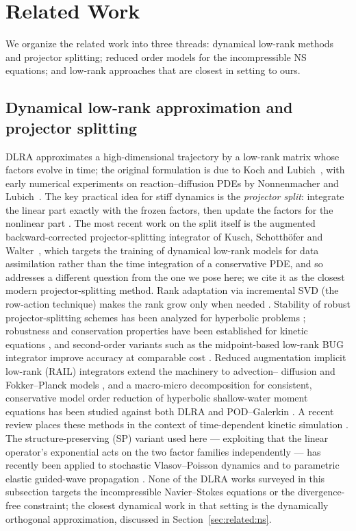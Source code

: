 
\section{Related Work}
\label{sec:related}

We organize the related work into three threads: dynamical low-rank methods
and projector splitting; reduced order models for the incompressible NS
equations; and low-rank approaches that are closest in setting to ours.

\subsection{Dynamical low-rank approximation and projector splitting}
\label{sec:related:dlra}

DLRA approximates a high-dimensional trajectory by a low-rank matrix whose
factors evolve in time; the original formulation is due to Koch and
Lubich~\cite{koch2007}, with early numerical experiments on reaction--diffusion
PDEs by Nonnenmacher and Lubich~\cite{nonnenmacher2008}. The key practical idea
for stiff dynamics is
the \emph{projector split}: integrate the linear part exactly with the frozen
factors, then update the factors for the nonlinear part
\cite{lubich2014}. The most recent work on the split itself is the augmented
backward-corrected projector-splitting integrator of Kusch, Schotthöfer and
Walter~\cite{kusch2026augmented}, which targets the training of dynamical
low-rank models for data assimilation rather than the time integration of a
conservative PDE, and so addresses a different question from the one we pose
here; we cite it as the closest modern projector-splitting method. Rank
adaptation via incremental SVD (the row-action technique) makes the rank grow
only when needed \cite{haasdonk2012}.
Stability of robust projector-splitting schemes has been analyzed for
hyperbolic problems \cite{kusch2023stability}; robustness and conservation
properties have been established for kinetic equations \cite{einkemmer2023},
and second-order variants such as the midpoint-based low-rank BUG integrator
improve accuracy at comparable cost \cite{ceruti2024}. Reduced augmentation
implicit low-rank (RAIL) integrators extend the machinery to advection--
diffusion and Fokker--Planck models \cite{rail2025}, and a macro-micro
decomposition for consistent, conservative model order reduction of hyperbolic
shallow-water moment equations has been studied against both DLRA and
POD--Galerkin \cite{koellermeier2024}. A recent review places these methods in
the context of time-dependent kinetic simulation \cite{einkemmer2024review}.
The structure-preserving (SP) variant used here --- exploiting that the linear
operator's exponential acts on the two factor families independently --- has
recently been applied to stochastic Vlasov--Poisson dynamics \cite{cui2026}
and to parametric elastic guided-wave propagation \cite{goutaudier2026}. None
of the DLRA works surveyed in this subsection targets the incompressible
Navier--Stokes equations or the divergence-free constraint; the closest
dynamical work in that setting is the dynamically orthogonal approximation,
discussed in Section~\ref{sec:related:ns}.

